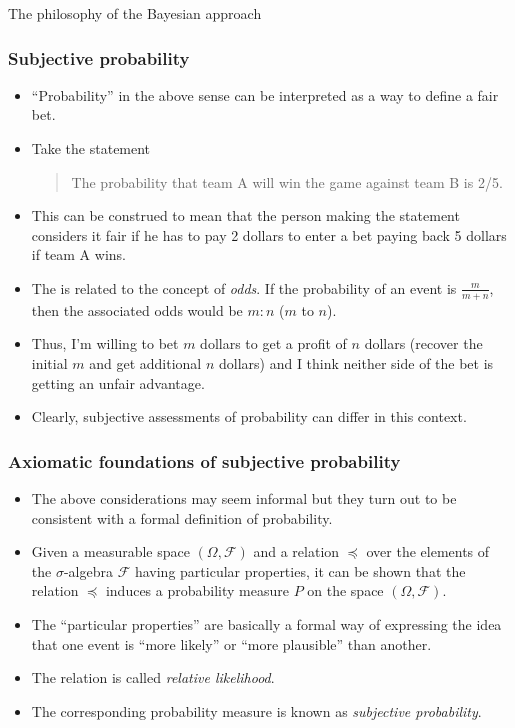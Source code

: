 \documentclass[10pt]{beamer}
\theoremstyle{definition}
\begin{document}
\begin{section}{The philosophy of the Bayesian approach}
\begin{frame}
\frametitle{Subjective probability}
\begin{itemize}\itemsep0.7em
\item ``Probability'' in the above sense can be interpreted as a way to define a fair bet.
\item Take the statement \begin{quote}
The probability that team A will win the game against team B is 2/5.
\end{quote}
\item This can be construed to mean that the person making the statement considers it fair if he has to pay 2 dollars to enter a bet paying back 5 dollars if team A wins.
\item The is related to the concept of \emph{odds}. If the probability of an event is  $\frac{m}{m+n}$, then the associated odds would be $m:n$ ($m$ to $n$).
\item Thus, I'm willing to bet $ m $ dollars to get a profit of $ n $ dollars (recover the initial $ m $ and get additional $ n $ dollars) and I think neither side of the bet is getting an unfair advantage.
\item Clearly, subjective assessments of probability can differ in this context.
\end{itemize}
\end{frame}

\begin{frame}
\frametitle{Axiomatic foundations of subjective probability}
\begin{itemize}\itemsep0.7em
\item The above considerations may seem informal but they turn out to be consistent with a formal definition of probability.
\item Given a measurable space $(\Omega,\mathcal{F})$ and a relation $\preceq$ over the elements of the $\sigma$-algebra $\mathcal{F}$ having particular properties, it can be shown that the relation $\preceq$ induces a probability measure $P$ on the space $(\Omega,\mathcal{F})$.
\item The ``particular properties'' are basically a formal way of expressing the idea that one event is ``more likely'' or ``more plausible'' than another.
\item The relation is called \emph{relative likelihood}.
\item The corresponding probability measure is known as \emph{subjective probability}.
\end{itemize}
\end{frame}


\end{section}
\end{document}
